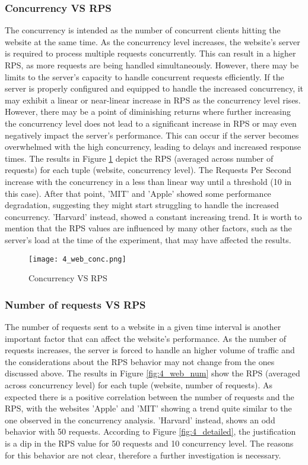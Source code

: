 \subsubsection{Concurrency VS RPS}
The concurrency is intended as the number of concurrent clients hitting the website at the same time. As the concurrency level increases, 
the website's server is required to process multiple requests concurrently. This can result in a higher 
RPS, as more requests are being handled simultaneously. However, there may be limits to the server's capacity 
to handle concurrent requests efficiently.
If the server is properly configured and equipped to handle the increased concurrency, it may exhibit a linear or near-linear increase in 
RPS as the concurrency level rises. 
However, there may be a point of diminishing returns where further increasing the concurrency level does not lead to a significant increase 
in RPS or may even negatively impact the server's performance. This can occur if the server becomes overwhelmed with the high concurrency, 
leading to delays and increased response times. The results in Figure \ref{fig:4_web_conc} depict the RPS (averaged across number of requests)
for each tuple (website, concurrency level). The Requests Per Second increase with the concurrency in a less than linear way until a 
threshold (10 in this case). After that point, 'MIT' and 'Apple' showed some performance degradation, suggesting they might start
struggling to handle the increased concurrency. 'Harvard' instead, showed a constant increasing trend. It is worth to mention that the 
RPS values are influenced by many other factors, such as the server's load at the time of the experiment, that may have affected the results.

    \begin{figure}[H]
        \centering
        \texttt{[image: 4\_web\_conc.png]}
        \caption{\small Concurrency VS RPS}
        \label{fig:4_web_conc}
    \end{figure}


\subsubsection{Number of requests VS RPS}
The number of requests sent to a website in a given time interval is another important factor that can affect the website's performance.
As the number of requests increases, the server is forced to handle an higher volume of traffic and the considerations about the 
RPS behavior may not change from the ones discussed above. The results in Figure \ref{fig:4_web_num} show the RPS (averaged across concurrency level)
for each tuple (website, number of requests). As expected there is a positive correlation between the number of requests and the RPS, with the websites
'Apple' and 'MIT' showing a trend quite similar to the one observed in the concurrency analysis. 'Harvard' instead, shows an odd behavior with 
50 requests. According to Figure \ref{fig:4_detailed}, the justification is a dip in the RPS value for 50 requests and 10 concurrency level.
The reasons for this behavior are not clear, therefore a further investigation is necessary.\\

